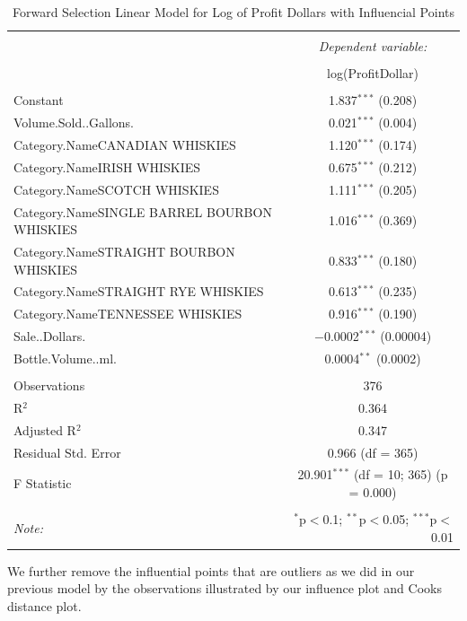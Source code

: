 \documentclass[]{elsarticle} %
\begin{document}
\begin{table}[!htbp] \centering 
  \caption{Forward Selection Linear Model for Log of Profit Dollars with Influencial Points} 
  \label{} 
\normalsize 
\begin{tabular}{@{\extracolsep{5pt}}lc} 
\\[-1.8ex]\hline 
\hline \\[-1.8ex] 
 & \multicolumn{1}{c}{\textit{Dependent variable:}} \\ 
\cline{2-2} 
\\[-1.8ex] & log(ProfitDollar) \\ 
\hline \\[-1.8ex] 
 Constant & 1.837$^{***}$ (0.208) \\ 
  Volume.Sold..Gallons. & 0.021$^{***}$ (0.004) \\ 
  Category.NameCANADIAN WHISKIES & 1.120$^{***}$ (0.174) \\ 
  Category.NameIRISH WHISKIES & 0.675$^{***}$ (0.212) \\ 
  Category.NameSCOTCH WHISKIES & 1.111$^{***}$ (0.205) \\ 
  Category.NameSINGLE BARREL BOURBON WHISKIES & 1.016$^{***}$ (0.369) \\ 
  Category.NameSTRAIGHT BOURBON WHISKIES & 0.833$^{***}$ (0.180) \\ 
  Category.NameSTRAIGHT RYE WHISKIES & 0.613$^{***}$ (0.235) \\ 
  Category.NameTENNESSEE WHISKIES & 0.916$^{***}$ (0.190) \\ 
  Sale..Dollars. & $-$0.0002$^{***}$ (0.00004) \\ 
  Bottle.Volume..ml. & 0.0004$^{**}$ (0.0002) \\ 
 \hline \\[-1.8ex] 
Observations & 376 \\ 
R$^{2}$ & 0.364 \\ 
Adjusted R$^{2}$ & 0.347 \\ 
Residual Std. Error & 0.966 (df = 365) \\ 
F Statistic & 20.901$^{***}$ (df = 10; 365)  (p = 0.000) \\ 
\hline 
\hline \\[-1.8ex] 
\textit{Note:}  & \multicolumn{1}{r}{$^{*}$p$<$0.1; $^{**}$p$<$0.05; $^{***}$p$<$0.01} \\ 
\end{tabular} 
\end{table}

We further remove the influential points that are outliers as we did in
our previous model by the observations illustrated by our influence plot
and Cooks distance plot.
\end{document}

